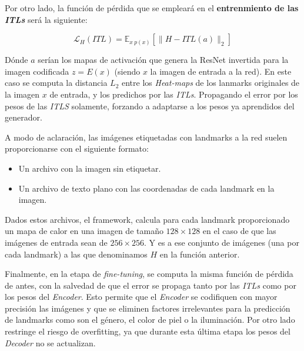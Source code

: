             \medskip

            \noindent Por otro lado, la función de pérdida que se empleará en el \textbf{entrenmiento de las \textit{ITLs}} será la siguiente: 

            \begin{equation} \label{eq::L2}
                \mathcal{L}_H(ITL) = \mathbb{E}_{x ~ p(x)} \left[ \| H-ITL(a)\|_2 \right]
            \end{equation}

            \noindent Dónde $a$ serían los mapas de activación que genera la ResNet invertida para la imagen codificada $z=E(x)$ (siendo $x$ la imagen de entrada a la red). En este caso se computa la distancia \textbf{$L_2$} entre los \textit{Heat-maps} de los lanmarks originales de la imagen $x$ de entrada, y los predichos por las \textit{ITLs}. Propagando el error por los pesos de las \textit{ITLS} solamente, forzando a adaptarse a los pesos ya aprendidos del generador.

            \medskip

            \noindent A modo de aclaración, las imágenes etiquetadas con landmarks a la red suelen proporcionarse con el siguiente formato: 

            \begin{itemize}
                \item Un archivo con la imagen sin etiquetar. 
                \item Un archivo de texto plano con las coordenadas de cada landmark en la imagen.
            \end{itemize}

            \noindent Dados estos archivos, el framework, calcula para cada landmark proporcionado un mapa de calor en una imagen de tamaño $128 \times 128$ en el caso de que las imágenes de entrada sean de $256 \times 256$. Y es a ese conjunto de imágenes (una por cada landmark) a las que denominamos $H$ en la función anterior.

            \medskip

            \noindent Finalmente, en la etapa de \textit{fine-tuning}, se computa la misma función de pérdida de antes, con la salvedad de que el error se propaga tanto por las \textit{ITLs} como por los pesos del \textit{Encoder}. Esto permite que el \textit{Encoder} se codifiquen con mayor precisión las imágenes y que se eliminen factores irrelevantes para la predicción de landmarks como son el género, el color de piel o la iluminación. Por otro lado restringe el riesgo de overfitting, ya que durante esta última etapa los pesos del \textit{Decoder} no se actualizan.

